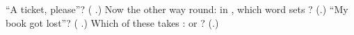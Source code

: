\begin{tcolorbox}[breakable,colback=teal!4,colframe=teal!35!black,title={Before you move on}]
\textquotedblleft{}A ticket, please\textquotedblright{}? (\textbf{  }.) Now the other way round: in \textbf{   }, which word sets \textbf{}? (\textbf{}.) \textquotedblleft{}My book got lost\textquotedblright{}? (\textbf{   }.) Which of these takes \textbf{}: \textbf{ } or \textbf{}? (\textbf{}.)
\end{tcolorbox}
